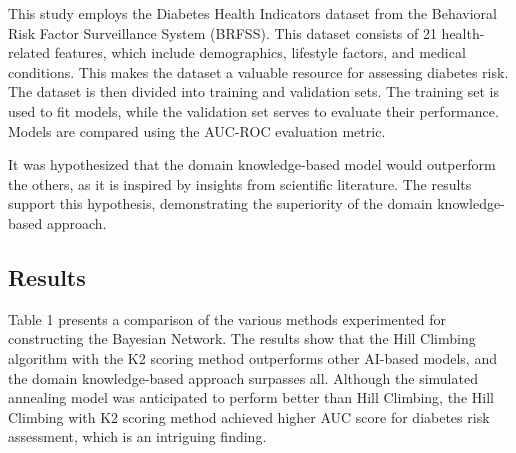 \documentclass[letterpaper]{article}
\begin{document}
This study employs the Diabetes Health Indicators dataset from the Behavioral Risk Factor Surveillance System (BRFSS). This dataset consists of 21 health-related features, which include demographics, lifestyle factors, and medical conditions. This makes the dataset a valuable resource for assessing diabetes risk. The dataset is then divided into training and validation sets. The training set is used to fit models, while the validation set serves to evaluate their performance. Models are compared using the AUC-ROC evaluation metric.



It was hypothesized that the domain knowledge-based model would outperform the others, as it is inspired by insights from scientific literature. The results support this hypothesis, demonstrating the superiority of the domain knowledge-based approach. 

\subsection{Results}

Table 1 presents a comparison of the various methods experimented for constructing the Bayesian Network. The results show that the Hill Climbing algorithm with the K2 scoring method outperforms other AI-based models, and the domain knowledge-based approach surpasses all. Although the simulated annealing model was anticipated to perform better than Hill Climbing, the Hill Climbing with K2 scoring method achieved higher AUC score for diabetes risk assessment, which is an intriguing finding.
\end{document}
